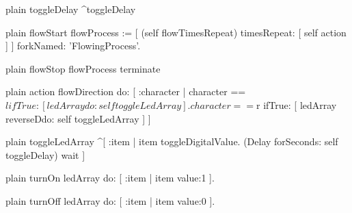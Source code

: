 \documentclass[10pt,twoside,english]{_support/latex/sbabook/sbabook}
\begin{document}
\begin{displaycode}{plain}
toggleDelay
	 ^toggleDelay
\end{displaycode}

\begin{displaycode}{plain}
flowStart
	flowProcess := [ (self flowTimesRepeat) timesRepeat: [
          self action
      ] ] forkNamed: 'FlowingProcess'.
\end{displaycode}

\begin{displaycode}{plain}
flowStop
	flowProcess terminate
\end{displaycode}

\begin{displaycode}{plain}
action  
flowDirection do: [ :character | character == $l ifTrue: [ ledArray do: self toggleLedArray  ]. 
                        character == $r ifTrue: [ ledArray reverseDdo: self toggleLedArray  ] ] 
\end{displaycode}

\begin{displaycode}{plain}
toggleLedArray
	^[ :item | item toggleDigitalValue. (Delay forSeconds: self toggleDelay) wait ]
\end{displaycode}

\begin{displaycode}{plain}
turnOn
	ledArray do: [ :item | item value:1 ].
\end{displaycode}

\begin{displaycode}{plain}
turnOff
	ledArray do: [ :item | item value:0 ].
\end{displaycode}


\backmatter

\end{document}
